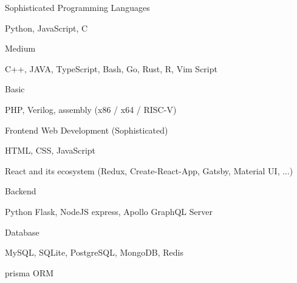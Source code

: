 

\begin{cventries}

  \cventry
  {Sophisticated}
  {Programming Languages}
  {}
  {}
  {
    \begin{cvitems}
      \item {Python, JavaScript, C}
    \end{cvitems}
  }

  \cventry
  {Medium}
  {}
  {}
  {}
  {
    \begin{cvitems}
      \item {C++, JAVA, TypeScript, Bash, Go, Rust, R, Vim Script}
    \end{cvitems}
  }

  \cventry
  {Basic}
  {}
  {}
  {}
  {
    \begin{cvitems}
      \item {PHP, Verilog, assembly (x86 / x64 / RISC-V)}
    \end{cvitems}
  }

  \cventry
  {Frontend}
  {Web Development (Sophisticated)}
  {}
  {}
  {
    \begin{cvitems}
      \item {HTML, CSS, JavaScript}
      \item {React and its ecosystem (Redux, Create-React-App, Gatsby, Material UI, ...)}
    \end{cvitems}
  }

  \cventry
  {Backend}
  {}
  {}
  {}
  {
    \begin{cvitems}
      \item {Python Flask, NodeJS express, Apollo GraphQL Server}
    \end{cvitems}
  }

  \cventry
  {Database}
  {}
  {}
  {}
  {
    \begin{cvitems}
      \item {MySQL, SQLite, PostgreSQL, MongoDB, Redis}
      \item {prisma ORM}
    \end{cvitems}
  }


\end{cventries}
